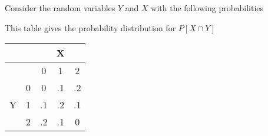 \question Consider the random variables $Y$ and $X$ with the following 
probabilities

This table gives the probability distribution for $P[X \cap Y]$

\begin{center}
\begin{tabular}{ | c | c | c | c | c |}
\hline
\cellcolor{black!100}& \cellcolor{black!100} & \multicolumn{3}{c|}{X} \\  
\hline
\cellcolor{black!100}& \cellcolor{black!100}& 0 & 1 & 2 \\
 \hline
 \multirow{3}{*}{Y} & 0 & 0 & .1 & .2 \\

 &1 & .1 & .2 & .1 \\

 &2 & .2 & .1 & 0 \\
  \hline
\end{tabular}
\end{center}


